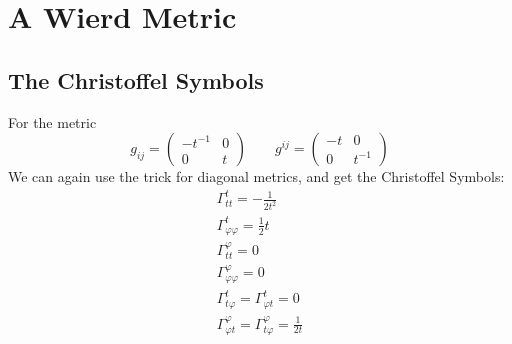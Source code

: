 \documentclass{article}
\begin{document}
\section{A Wierd Metric}
\subsection{The Christoffel Symbols}
For the metric
\begin{equation}
    g_{ij} = \begin{pmatrix}
        -t^{-1} & 0 \\ 0 & t
    \end{pmatrix}
    \qquad
    g^{ij} = \begin{pmatrix}
        -t & 0 \\ 0 & t^{-1}
    \end{pmatrix}
\end{equation}
We can again use the trick for diagonal metrics, and get the Christoffel Symbols:
\begin{equation}
\begin{gathered}
    \Gamma^{t}_{tt} = -\frac{1}{2t^2}
    \\
    \Gamma^{t}_{\varphi\varphi} = \frac{1}{2}t
    \\
    \Gamma^{\varphi}_{tt} = 0
    \\
    \Gamma^{\varphi}_{\varphi\varphi} = 0
    \\
    \Gamma^{t}_{t\varphi} = \Gamma^{t}_{\varphi t} = 0
    \\
    \Gamma^{\varphi}_{\varphi t} = \Gamma^{\varphi}_{t\varphi} = \frac{1}{2t}
\end{gathered}
\end{equation}
\end{document}
